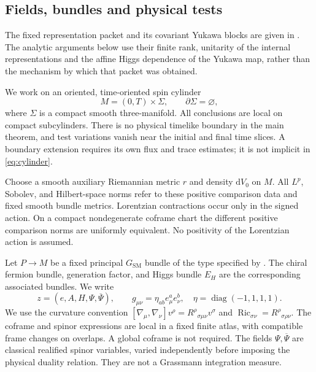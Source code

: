 \documentclass[11pt]{article}
\numberwithin{equation}{section}
\theoremstyle{definition}
\theoremstyle{remark}
\newcommand{\dd}{\mathrm d}
\newcommand{\diag}{\operatorname{diag}}
\newcommand{\Ric}{\operatorname{Ric}}
\newcommand{\bPsi}{\overline\Psi}
\newcommand{\dV}{\dd V}
\begin{document}
\subsection{Fields, bundles and physical tests}

The fixed representation packet and its covariant Yukawa blocks are given
in . The analytic arguments below
use their finite rank, unitarity of the internal representations and the
affine Higgs dependence of the Yukawa map, rather than the mechanism by
which that packet was obtained.

We work on an oriented, time-oriented spin cylinder
\begin{equation}
 M=(0,T)\times\Sigma,
 \qquad \partial\Sigma=\varnothing,
 \label{eq:cylinder}
\end{equation}
where $\Sigma$ is a compact smooth three-manifold. All conclusions are local on compact subcylinders. There is no physical timelike boundary in the main theorem, and test variations vanish near the initial and final time slices. A boundary extension requires its own flux and trace estimates; it is not implicit in \eqref{eq:cylinder}.

Choose a smooth auxiliary Riemannian metric $r$ and density $\dV_0$ on $M$. All $L^p$, Sobolev, and Hilbert-space norms refer to these positive comparison data and fixed smooth bundle metrics. Lorentzian contractions occur only in the signed action. On a compact nondegenerate coframe chart the different positive comparison norms are uniformly equivalent. No positivity of the Lorentzian action is assumed.

Let $P\to M$ be a fixed principal $G_{\mathrm{SM}}$ bundle of the type specified by . The chiral fermion bundle, generation factor, and Higgs bundle $E_H$ are the corresponding associated bundles. We write
\begin{equation}
 z=(e,A,H,\Psi,\bPsi),\qquad
 g_{\mu\nu}=\eta_{ab}e^a_\mu e^b_\nu,
 \quad \eta=\diag(-1,1,1,1).
 \label{eq:fields}
\end{equation}
We use the curvature convention $[\nabla_\mu,\nabla_\nu]v^\rho=R^\rho{}_{\sigma\mu\nu}v^\sigma$ and $\Ric_{\sigma\nu}=R^\rho{}_{\sigma\rho\nu}$. The coframe and spinor expressions are local in a fixed finite atlas, with compatible frame changes on overlaps. A global coframe is not required. The fields $\Psi,\bPsi$ are classical realified spinor variables, varied independently before imposing the physical duality relation. They are not a Grassmann integration measure.
\end{document}
